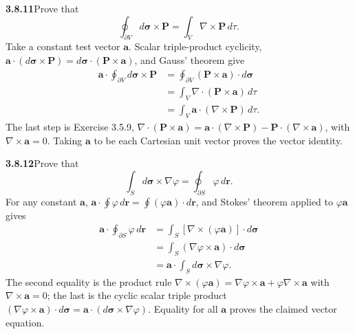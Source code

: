 
\par\bigskip
\noindent\textbf{3.8.11}\quad Prove that
\[
\oint_{\partial V}d\boldsymbol{\sigma}\times\mathbf{P}
=\int_{V}\nabla\times\mathbf{P}\,d\tau.
\]
\solution
Take a constant test vector $\mathbf a$. Scalar triple-product
cyclicity,
$\mathbf a\cdot(d\boldsymbol\sigma\times\mathbf P)
=d\boldsymbol\sigma\cdot(\mathbf P\times\mathbf a)$, and Gauss' theorem
give
\[
\begin{aligned}
\mathbf a\cdot\oint_{\partial V}d\boldsymbol\sigma\times\mathbf P
&=\oint_{\partial V}(\mathbf P\times\mathbf a)\cdot d\boldsymbol\sigma\\
&=\int_V\nabla\cdot(\mathbf P\times\mathbf a)\,d\tau\\
&=\int_V\mathbf a\cdot(\nabla\times\mathbf P)\,d\tau.
\end{aligned}
\]
The last step is Exercise 3.5.9,
$\nabla\cdot(\mathbf P\times\mathbf a)
=\mathbf a\cdot(\nabla\times\mathbf P)-\mathbf P\cdot(\nabla\times\mathbf a)$,
with $\nabla\times\mathbf a=0$. Taking $\mathbf a$ to be each
Cartesian unit vector proves the vector identity.

\par\bigskip
\noindent\textbf{3.8.12}\quad Prove that
\[
\int_{S}d\boldsymbol{\sigma}\times\nabla\varphi
=\oint_{\partial S}\varphi\,d\mathbf{r}.
\]
\solution
For any constant $\mathbf a$,
$\mathbf a\cdot\oint\varphi\,d\mathbf r=\oint(\varphi\mathbf a)\cdot
d\mathbf r$, and Stokes' theorem applied to $\varphi\mathbf a$ gives
\[
\begin{aligned}
\mathbf a\cdot\oint_{\partial S}\varphi\,d\mathbf r
&=\int_S[\nabla\times(\varphi\mathbf a)]\cdot d\boldsymbol\sigma\\
&=\int_S(\nabla\varphi\times\mathbf a)\cdot d\boldsymbol\sigma\\
&=\mathbf a\cdot\int_Sd\boldsymbol\sigma\times\nabla\varphi.
\end{aligned}
\]
The second equality is the product rule
$\nabla\times(\varphi\mathbf a)=\nabla\varphi\times\mathbf a
+\varphi\nabla\times\mathbf a$ with $\nabla\times\mathbf a=0$; the last
is the cyclic scalar triple product
$(\nabla\varphi\times\mathbf a)\cdot d\boldsymbol\sigma
=\mathbf a\cdot(d\boldsymbol\sigma\times\nabla\varphi)$.
Equality for all $\mathbf a$ proves the claimed vector equation.

